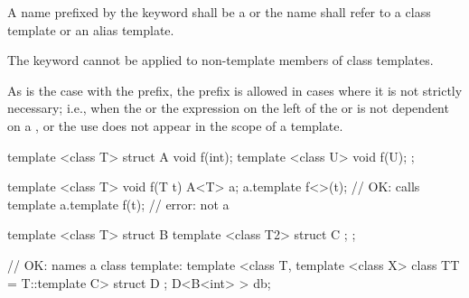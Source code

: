 \pnum
A name prefixed by the keyword
shall be a  or
the name shall refer to a class template or an alias template.
\begin{note}
The keyword
cannot be applied to non-template members of class templates.
\end{note}
\begin{note}
As is the case with the
prefix, the
prefix is allowed in cases where it is not strictly
necessary; i.e., when the  or
the expression on the left of
the
\tcode{->}
or
is not dependent on a
, or the use does not appear in the
scope of a template.
\end{note}
\begin{example}
\begin{codeblock}
template <class T> struct A {
  void f(int);
  template <class U> void f(U);
};

template <class T> void f(T t) {
  A<T> a;
  a.template f<>(t);                    // OK: calls template
  a.template f(t);                      // error: not a 
}

template <class T> struct B {
  template <class T2> struct C { };
};

// OK:  names a class template:
template <class T, template <class X> class TT = T::template C> struct D { };
D<B<int> > db;
\end{codeblock}
\end{example}

